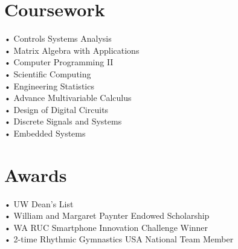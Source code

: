 \documentclass[]{hieudo-build}
\begin{document}
\begin{minipage}[t]{0.22\textwidth}
\section{Coursework}
• Controls Systems Analysis \\
• Matrix Algebra with Applications\\
• Computer Programming II\\
• Scientific Computing\\
• Engineering Statistics\\
• Advance Multivariable Calculus\\
• Design of Digital Circuits \\
• Discrete Signals and Systems\\
• Embedded Systems\\
\sectionsep



\section{Awards} 
• UW Dean's List\\
• William and Margaret Paynter Endowed Scholarship\\
• WA RUC Smartphone Innovation Challenge Winner\\
• 2-time Rhythmic Gymnastics USA National Team Member\\
\sectionsep


%
%
\end{minipage} 
\hfill
\end{document}
